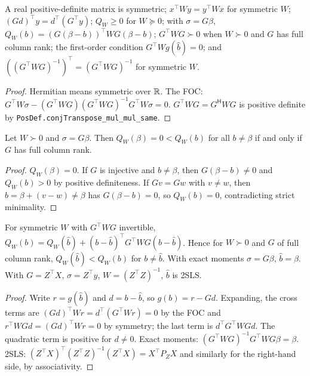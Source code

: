 \begin{lemma}
\label{lem:gmm-aux}
\leanok
{}
A real positive-definite matrix is symmetric; $x^\top Wy = y^\top Wx$ for symmetric $W$; $(Gd)^\top y = d^\top(G^\top y)$;
$Q_W\ge 0$ for $W\succeq 0$; with $\sigma = G\beta$, $Q_W(b) = (G(\beta-b))^\top W G(\beta-b)$; $G^\top WG\succ 0$ when
$W\succ0$ and $G$ has full column rank; the first-order condition $G^\top Wg(\hat b) = 0$; and
$((G^\top WG)^{-1})^\top = (G^\top WG)^{-1}$ for symmetric $W$.
\end{lemma}
\begin{proof}
\leanok
Hermitian means symmetric over $\mathbb{R}$. The FOC: $G^\top W\sigma - (G^\top WG)(G^\top WG)^{-1}G^\top W\sigma = 0$.
$G^\top WG = G^{\mathsf H}WG$ is positive definite by \texttt{PosDef.conjTranspose\_mul\_mul\_same}.
\end{proof}

\begin{theorem}
\label{thm:gmm-identified}
\leanok
{}
Let $W\succ 0$ and $\sigma = G\beta$. Then $Q_W(\beta) = 0 < Q_W(b)$ for all $b\neq\beta$ if and only if $G$ has full
column rank.
\end{theorem}
\begin{proof}
\leanok
$Q_W(\beta) = 0$. If $G$ is injective and $b\ne\beta$, then $G(\beta-b)\ne0$ and $Q_W(b) > 0$ by positive definiteness.
If $Gv = Gw$ with $v\ne w$, then $b = \beta+(v-w)\neq\beta$ has $G(\beta - b) = 0$, so $Q_W(b) = 0$, contradicting
strict minimality.
\end{proof}

\begin{theorem}
\label{thm:gmm-min}
\leanok
{}
For symmetric $W$ with $G^\top WG$ invertible, $Q_W(b) = Q_W(\hat b) + (b-\hat b)^\top G^\top WG(b-\hat b)$. Hence for
$W\succ0$ and $G$ of full column rank, $Q_W(\hat b) < Q_W(b)$ for $b\ne\hat b$. With exact moments $\sigma = G\beta$,
$\hat b = \beta$. With $G = Z^\top X$, $\sigma = Z^\top y$, $W = (Z^\top Z)^{-1}$, $\hat b$ is 2SLS.
\end{theorem}
\begin{proof}
\leanok
Write $r = g(\hat b)$ and $d = b-\hat b$, so $g(b) = r - Gd$. Expanding, the cross terms are
$(Gd)^\top Wr = d^\top(G^\top Wr) = 0$ by the FOC and $r^\top WGd = (Gd)^\top Wr = 0$ by symmetry; the last term is
$d^\top G^\top WGd$. The quadratic term is positive for $d\ne0$. Exact moments: $(G^\top WG)^{-1}G^\top WG\beta = \beta$.
2SLS: $(Z^\top X)^\top(Z^\top Z)^{-1}(Z^\top X) = X^\top P_ZX$ and similarly for the right-hand side, by associativity.
\end{proof}

